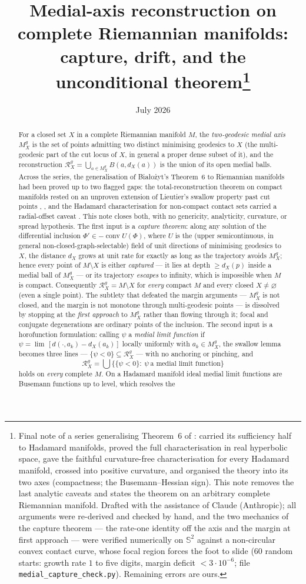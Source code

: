 \documentclass[11pt]{article}
\title{Medial-axis reconstruction on complete Riemannian manifolds:\\
capture, drift, and the unconditional theorem\thanks{Final note of a
series generalising Theorem~6 of \cite{Bia}: \cite{R1} carried its
sufficiency half to Hadamard manifolds, \cite{R2} proved the full
characterisation in real hyperbolic space, \cite{R3} gave the faithful
curvature-free characterisation for every Hadamard manifold, \cite{Sph}
crossed into positive curvature, and \cite{Tri} organised the theory
into its two axes (compactness; the Busemann--Hessian sign). This note
removes the last analytic caveats and states the theorem on an
arbitrary complete Riemannian manifold. Drafted with the assistance of
Claude (Anthropic); all arguments were re-derived and checked by hand,
and the two mechanics of the capture theorem --- the rate-one identity
off the axis and the margin at first approach --- were verified
numerically on $\mathbb{S}^{2}$ against a non-circular convex contact
curve, whose focal region forces the foot to slide (60 random starts:
growth rate $1$ to five digits, margin deficit $<3\cdot10^{-6}$; file
\texttt{medial\_capture\_check.py}). Remaining errors are ours.}}
\author{}
\date{July 2026}
\theoremstyle{remark}
\newcommand{\X}{X}
\newcommand{\Mg}{M^{g}_{\X}}
\newcommand{\Rg}{\mathcal{R}^{g}_{\X}}
\newcommand{\dX}{d_{\X}}
\newcommand{\conv}{\operatorname{conv}}
\begin{document}
\maketitle

\begin{abstract}
For a closed set $\X$ in a complete Riemannian manifold $M$, the
\emph{two-geodesic medial axis} $\Mg$ is the set of points admitting
two distinct minimising geodesics to $\X$ (the multi-geodesic part of
the cut locus of $\X$, in general a proper dense subset of it), and
the reconstruction $\Rg=\bigcup_{a\in\Mg}B(a,\dX(a))$ is the union of
its open medial balls. Across the series, the generalisation of
Bia\l{}o\.zyt's Theorem~6 to Riemannian manifolds had been proved up to
two flagged gaps: the total-reconstruction theorem on compact manifolds
rested on an unproven extension of Lieutier's swallow property past cut
points \cite[Rem.~8.4]{Sph}, \cite[Rem.~6.5]{Tri}, and the Hadamard
characterisation for non-compact contact sets carried a radial-offset
caveat \cite[Thm.~3.4]{R3}. This note closes both, with no genericity,
analyticity, curvature, or spread hypothesis. The first input is a
\emph{capture theorem}: along any solution of the differential
inclusion $\Phi'\in-\conv U(\Phi)$, where $U$ is the (upper
semicontinuous, in general non-closed-graph-selectable) field of unit
directions of minimising geodesics to $\X$, the distance $\dX$ grows at
unit rate for exactly as long as the trajectory avoids $\Mg$; hence
every point of $M\setminus\X$ is either \emph{captured} --- it lies at
depth $\ge\dX(p)$ inside a medial ball of $\Mg$ --- or its trajectory
\emph{escapes} to infinity, which is impossible when $M$ is compact.
Consequently $\Rg=M\setminus\X$ for \emph{every} compact $M$ and every
closed $\X\neq\varnothing$ (even a single point). The subtlety that
defeated the margin arguments --- $\Mg$ is not closed, and the margin
is not monotone through multi-geodesic points --- is dissolved by
stopping at the \emph{first approach} to $\Mg$ rather than flowing
through it; focal and conjugate degenerations are ordinary points of
the inclusion. The second input is a horofunction formulation: calling
$\psi$ a \emph{medial limit function} if $\psi=\lim\,[d(\cdot,a_{k})
-\dX(a_{k})]$ locally uniformly with $a_{k}\in\Mg$, the swallow lemma
becomes three lines --- $\{\psi<0\}\subseteq\Rg$ --- with no anchoring
or pinching, and
\[
  \Rg=\bigcup\bigl\{\{\psi<0\}:\ \psi\ \text{a medial limit
  function}\bigr\}
\]
holds on \emph{every} complete $M$. On a Hadamard manifold ideal medial
limit functions are Busemann functions up to level, which resolves the

\end{abstract}
\end{document}
